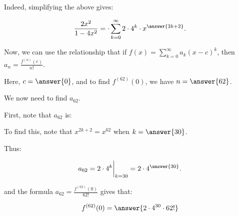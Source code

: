 \documentclass{ximera}
\begin{document}
\begin{exercise}
\begin{exercise}
Indeed, simplifying the above gives:

\[
\frac{2x^2}{1-4x^2} =  \cdot  \sum_{k=0}^{\infty} 2\cdot 4^k \cdot  x^{\answer{2k+2}}.
\]


\begin{exercise}
Now, we can use the relationship that if $f(x) = \sum_{k=0}^{\infty} a_k(x-c)^k$, then $a_n = \frac{f^{(n)}(c)}{n!}$.

Here, $c= \answer{0}$, and to find $f^{(62)}(0)$, we have $n=\answer{62}$. 

We now need to find $a_{62}$.

\begin{exercise}
First, note that $a_{62}$ is:
\begin{multipleChoice}
\end{multipleChoice}

To find this, note that $x^{2k+2} = x^{62}$ when $k=\answer{30}$.  

Thus:

\[
a_{62} = 2 \cdot 4^{k} \bigg|_{k=30} = 2 \cdot 4^{\answer{30}}.
\]

and the formula $a_{62} = \frac{f^{(62)}(0)}{62!}$ gives that:

\[
f^{(62)}(0) = \answer{2 \cdot 4^{30} \cdot 62!}
\]
\end{exercise}
\end{exercise}
\end{exercise}
\end{exercise}
\end{document}
